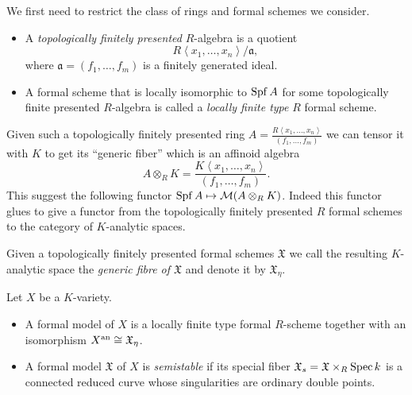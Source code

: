 We first need to restrict the class of rings and formal schemes we consider. 
\begin{definition}\label{def:topologically_finite_presentation_algebra}
	\begin{itemize}
		\item 
	A \emph{topologically finitely presented} $R$-algebra is a quotient \[
		R\left<x_1, \ldots, x_n \right> / \mathfrak{a} 
	,\] where $\mathfrak{a}  = (f_1, \ldots, f_m)$ is a finitely generated ideal. 
\item A formal scheme that is locally isomorphic to $\operatorname{Spf} A$ for some topologically finite presented $R$-algebra is called a \emph{locally finite type} $R$ formal scheme. 
	\end{itemize}

\end{definition}

Given such a topologically finitely presented ring $A = \frac{R \left<x_1, \ldots, x_n \right>}{(f_1, \ldots, f_m)}$ we can tensor it with $K$ to get its ``generic fiber'' which is an affinoid algebra \[
A \otimes _R K = \frac{K \left<x_1, \ldots, x_n \right>}{(f_1, \ldots, f_m)}
.\]  
This suggest the following functor $\operatorname{Spf} A \mapsto \mathcal{M} (A \otimes_R K)$. 
Indeed this functor glues to give a functor from the topologically finitely presented $R$ formal schemes to the category of $K$-analytic spaces. 

\begin{definition}\label{def:generic_fibre_of_formal_scheme}
Given a topologically finitely presented formal schemes $\mathfrak{X} $ we call the resulting $K$-analytic space the \emph{generic fibre of  $\mathfrak{X} $} and denote it by $\mathfrak{X} _\eta$. 
\end{definition}

\begin{definition}
	Let $X$ be a $K$-variety. 
	\begin{itemize}
		\item A formal model of $X$ is a locally finite type formal $R$-scheme together with an isomorphism $X{}^{\text{an}} \cong \mathfrak{X}_{\eta}$.
		\item A formal model $\mathfrak{X}  $ of $X$ is \emph{semistable} if its special fiber $\mathfrak{X} _s = \mathfrak{X} \times_R \operatorname{Spec} k$ is a connected reduced curve whose singularities are ordinary double points. 
	\end{itemize}
\end{definition}

\begin{comment}
Later we will extend the construction of the generic fiber to the larger class of \emph{special formal schemes}.
These will be really useful for understanding the relation between formal models of curves and their Berkovich space. 
\begin{definition}\label{def:special_r_algebra}
	A \emph{special} $R$-algebra is a $R$-algebra of the form \[
		\frac{A\left<x_1, \ldots, x_n \right>[[y_1, \ldots, y_m]]}{(f_1, \ldots, f_\ell)}
	.\] 
\end{definition}
\end{comment}





